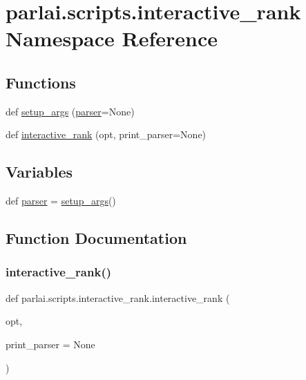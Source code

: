 \hypertarget{namespaceparlai_1_1scripts_1_1interactive__rank}{}\section{parlai.\+scripts.\+interactive\+\_\+rank Namespace Reference}
\label{namespaceparlai_1_1scripts_1_1interactive__rank}
\subsection*{Functions}
\begin{DoxyCompactItemize}
\item 
def \hyperlink{namespaceparlai_1_1scripts_1_1interactive__rank_af87c6b5d3f8843e51461c9cfd75fd510}{setup\+\_\+args} (\hyperlink{namespaceparlai_1_1scripts_1_1interactive__rank_a68288547427936a867a1b8eb9a945be7}{parser}=None)
\item 
def \hyperlink{namespaceparlai_1_1scripts_1_1interactive__rank_a9997f1d0eba4a72a45a773ec05874af3}{interactive\+\_\+rank} (opt, print\+\_\+parser=None)
\end{DoxyCompactItemize}
\subsection*{Variables}
\begin{DoxyCompactItemize}
\item 
def \hyperlink{namespaceparlai_1_1scripts_1_1interactive__rank_a68288547427936a867a1b8eb9a945be7}{parser} = \hyperlink{namespaceparlai_1_1scripts_1_1interactive__rank_af87c6b5d3f8843e51461c9cfd75fd510}{setup\+\_\+args}()
\end{DoxyCompactItemize}


\subsection{Function Documentation}
\mbox{\label{namespaceparlai_1_1scripts_1_1interactive__rank_a9997f1d0eba4a72a45a773ec05874af3}} 
\subsubsection{\texorpdfstring{interactive\+\_\+rank()}{interactive\_rank()}}
{\footnotesize\ttfamily def parlai.\+scripts.\+interactive\+\_\+rank.\+interactive\+\_\+rank (\begin{DoxyParamCaption}\item[{}]{opt,  }\item[{}]{print\+\_\+parser = {\ttfamily None} }\end{DoxyParamCaption})}



